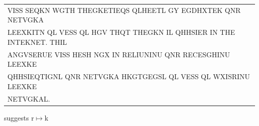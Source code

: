 \documentclass[aspectratio=169, lualatex, 10pt,dvipsnames,svgnames]{beamer} %
\def\enbleu#1{\textcolor{bleu}{#1}}
\begin{document}
\begin{frame}
{\begin{tabular}[t]{l}
      V\enbleu{I}SS S\enbleu{E}QK\enbleu{N} WG\enbleu{T}\enbleu{H} \enbleu{T}\enbleu{H}\enbleu{E}GK\enbleu{E}\enbleu{T}\enbleu{I}EQS QLH\enbleu{E}E\enbleu{T}L GY EGDHX\enbleu{T}\enbleu{E}K Q\enbleu{N}R \enbleu{N}\enbleu{E}\enbleu{T}VGKA \\
      L\enbleu{E}EXK\enbleu{I}\enbleu{T}N QL V\enbleu{E}SS QL \enbleu{H}GV \enbleu{T}\enbleu{H}Q\enbleu{T} \enbleu{T}\enbleu{H}\enbleu{E}GKN \enbleu{I}L QHHS\enbleu{I}\enbleu{E}R \enbleu{I}\enbleu{N} \enbleu{T}\enbleu{H}\enbleu{E} \enbleu{I}\enbleu{N}\enbleu{T}\enbleu{E}K\enbleu{N}\enbleu{E}\enbleu{T}. \enbleu{T}\enbleu{H}\enbleu{I}L \\
      A\enbleu{N}GVS\enbleu{E}RU\enbleu{E} V\enbleu{I}SS \enbleu{H}\enbleu{E}SH NGX \enbleu{I}\enbleu{N} R\enbleu{E}L\enbleu{I}U\enbleu{N}\enbleu{I}\enbleu{N}U Q\enbleu{N}R R\enbleu{E}C\enbleu{E}SGH\enbleu{I}\enbleu{N}U L\enbleu{E}EXK\enbleu{E} \\
      QHHS\enbleu{I}EQ\enbleu{T}\enbleu{I}G\enbleu{N}L Q\enbleu{N}R \enbleu{N}\enbleu{E}\enbleu{T}VGKA HKG\enbleu{T}GEGSL QL V\enbleu{E}SS QL WX\enbleu{I}SR\enbleu{I}\enbleu{N}U L\enbleu{E}EXK\enbleu{E} \\
      \enbleu{N}\enbleu{E}\enbleu{T}VGKAL.
    \end{tabular}
  }
  \vspace{0.5cm}

  \normalsize
  \pause
  
  suggests r$\mapsto$k
  \color{black}
\end{frame}
\end{document}
